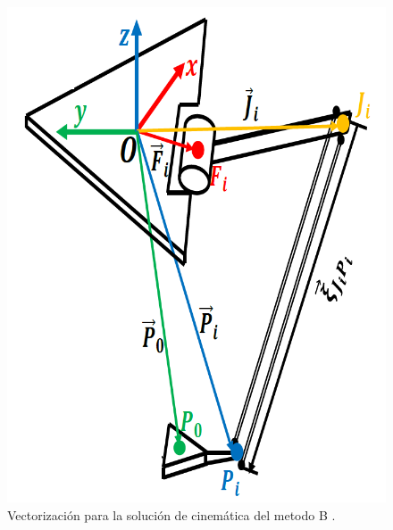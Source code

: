             \begin{figure}[htb]
                 \centering
                 \includegraphics[width=0.55\linewidth]{Main/Chapter4/Images4/DIBUJO26.png}
                  \caption{Vectorización para la solución de cinemática del metodo B  \cite{Path_Planning_and_Trajectory_Optimization}.}
                  \label{f:Cap4_Metodo_B_Modelacion_Cinematica_Posicion_33}
            \end{figure} 
    

